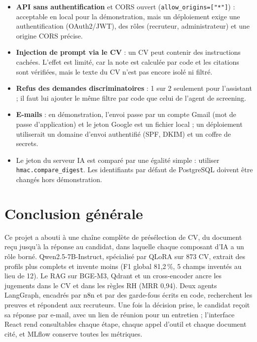 \documentclass[11pt,a4paper]{report}
\begin{document}
\begin{itemize}
\item \textbf{API sans authentification} et CORS ouvert (\texttt{allow\_origins=["*"]}) : acceptable en local pour la démonstration, mais un déploiement exige une authentification (OAuth2/JWT), des rôles (recruteur, administrateur) et une origine CORS précise.
\item \textbf{Injection de prompt via le CV} : un CV peut contenir des instructions cachées. L'effet est limité, car la note est calculée par code et les citations sont vérifiées, mais le texte du CV n'est pas encore isolé ni filtré.
\item \textbf{Refus des demandes discriminatoires} : 1 sur 2 seulement pour l'assistant ; il faut lui ajouter le même filtre par code que celui de l'agent de screening.
\item \textbf{E-mails} : en démonstration, l'envoi passe par un compte Gmail (mot de passe d'application) et le jeton Google est un fichier local ; un déploiement utiliserait un domaine d'envoi authentifié (SPF, DKIM) et un coffre de secrets.
\item Le jeton du serveur IA est comparé par une égalité simple : utiliser \texttt{hmac.compare\_digest}. Les identifiants par défaut de PostgreSQL doivent être changés hors démonstration.
\end{itemize}

\chapter*{Conclusion générale}

Ce projet a abouti à une chaîne complète de présélection de CV, du document reçu jusqu'à la réponse au candidat, dans laquelle chaque composant d'IA a un rôle borné. Qwen2.5-7B-Instruct, spécialisé par QLoRA sur 873 CV, extrait des profils plus complets et invente moins (F1 global 81,2\,\%, 5 champs inventés au lieu de 12). Le RAG sur BGE-M3, Qdrant et un cross-encoder ancre les jugements dans le CV et dans les règles RH (MRR 0,94). Deux agents LangGraph, encadrés par n8n et par des garde-fous écrits en code, recherchent les preuves et répondent aux recruteurs. Une fois la décision prise, le candidat reçoit sa réponse par e-mail, avec un lien de réunion pour un entretien ; l'interface React rend consultables chaque étape, chaque appel d'outil et chaque document cité, et MLflow conserve toutes les métriques.
\end{document}
